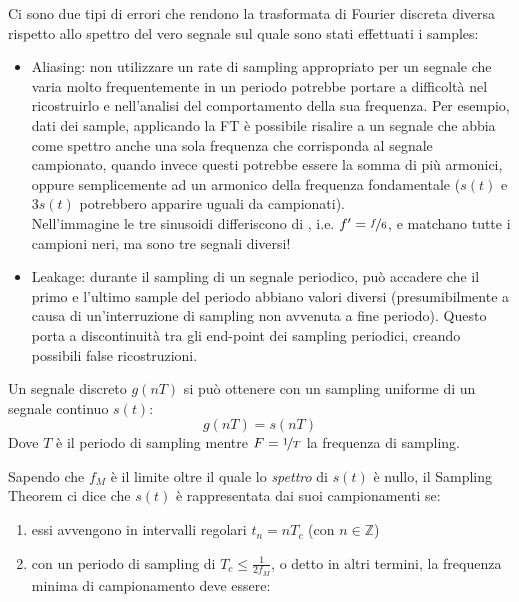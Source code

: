 Ci sono due tipi di errori che rendono la trasformata di Fourier discreta diversa rispetto allo spettro del vero segnale sul quale sono stati effettuati i samples:
\begin{itemize}
    \item Aliasing: non utilizzare un rate di sampling appropriato per un segnale che varia molto frequentemente in un periodo potrebbe portare a difficoltà nel ricostruirlo e nell'analisi del comportamento della sua frequenza.
    Per esempio, dati dei sample, applicando la FT è possibile risalire a un segnale che abbia come spettro anche una sola frequenza che corrisponda al segnale campionato, quando invece questi potrebbe essere la somma di più armonici, oppure semplicemente ad un armonico della frequenza fondamentale ($s(t)$ e $3s(t)$ potrebbero apparire uguali da campionati).\\
    Nell'immagine le tre sinusoidi differiscono di , i.e. $f' = \nicefrac{f}{6}$, e matchano tutte i campioni neri, ma sono tre segnali diversi!
    \item Leakage: durante il sampling di un segnale periodico, può accadere che il primo e l'ultimo sample del periodo abbiano valori diversi (presumibilmente a causa di un'interruzione di sampling non avvenuta a fine periodo). Questo porta a discontinuità tra gli end-point dei sampling periodici, creando possibili false ricostruzioni. 
\end{itemize}

Un segnale discreto $g(nT)$ si può ottenere con un sampling uniforme di un segnale continuo $s(t)$:
\[ g(nT) = s(nT) \]
Dove $T$ è il periodo di sampling mentre $F=\nicefrac{1}{T}$ la frequenza di sampling.


Sapendo che $f_M$ è il limite oltre il quale lo \textit{spettro} di $s(t)$ è nullo, il Sampling Theorem ci dice che $s(t)$ è rappresentata dai suoi campionamenti se:
\begin{enumerate}
    \item essi avvengono in intervalli regolari $t_n = nT_c$ (con $n \in \mathbb{Z}$)
    \item con un periodo di sampling di $T_c \leq \frac{1}{2f_M}$, o detto in altri termini, la frequenza minima di campionamento deve essere:
\end{enumerate}

